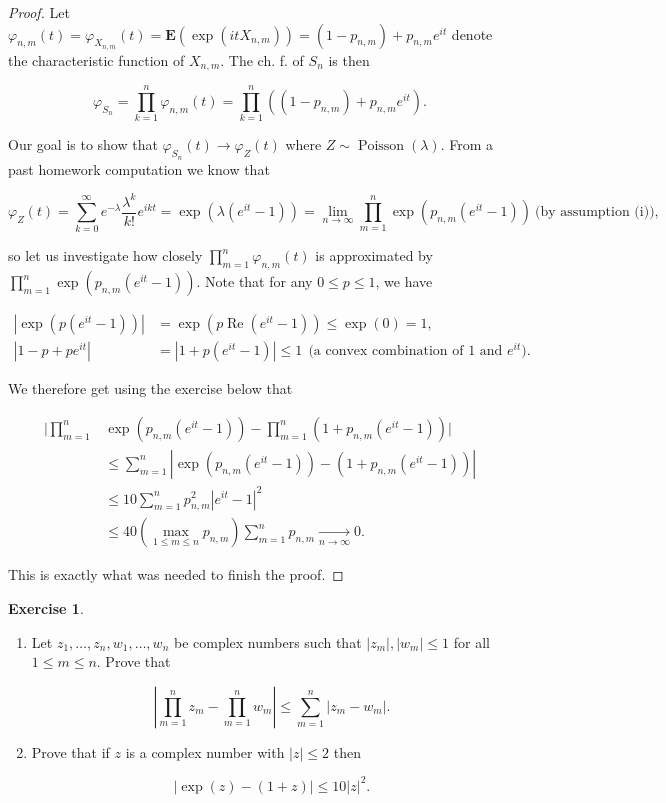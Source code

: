 \documentclass[11pt]{report}
\theoremstyle{plain}
\theoremstyle{definition}
\newtheorem{xexercise}[thm]{Exercise}
\begin{document}
\begin{proof}
Let
$\varphi_{n,m}(t)=\varphi_{X_{n,m}}(t)=\mathbf{E}(\exp(it
X_{n,m})) = (1-p_{n,m})+p_{n,m}e^{it}$
denote the characteristic function of $X_{n,m}$. The
ch. f. of $S_n$ is then

\[
\varphi_{S_n} = \prod_{k=1}^n \varphi_{n,m}(t) = \prod_{k=1}^n \left((1-p_{n,m})+p_{n,m}e^{it}\right).
\]

Our goal is to show that
$\varphi_{S_n}(t)\to \varphi_Z(t)$ where
$Z\sim \operatorname{Poisson}(\lambda)$. From a past
homework computation we know that

\[
\varphi_Z(t) = \sum_{k=0}^\infty e^{-\lambda} \frac{\lambda^k}{k!} e^{ikt} =\exp(\lambda(e^{it}-1)) = \lim_{n\to\infty} \prod_{m=1}^n \exp(p_{n,m}(e^{it}-1))
 \ \textrm{(by assumption (i)),}
\]

so let us investigate how closely
$\prod_{m=1}^n\varphi_{n,m}(t)$ is approximated by
$\prod_{m=1}^n\exp(p_{n,m}(e^{it}-1))$. Note that for
any $0\le p\le 1$, we have

\begin{align*}
|\exp(p(e^{it}-1))| &= \exp(p \operatorname{Re}(e^{it}-1)) \le \exp(0)=1, \\
|1-p+pe^{it}| &= |1+p(e^{it}-1)| \le 1 \ \ \textrm{(a convex combination of $1$ and $e^{it}$)}.
\end{align*}

We therefore get using the exercise below that

\begin{align*}
\Bigg| \prod_{m=1}^n &\exp\left(p_{n,m}(e^{it}-1)\right)-\prod_{m=1}^n (1+p_{n,m}(e^{it}-1))\Bigg| \\ &
\le \sum_{m=1}^n |\exp\left(p_{n,m}(e^{it}-1)\right)-(1+p_{n,m}(e^{it}-1))| \\
&\le 10\sum_{m=1}^n p_{n,m}^2 |e^{it}-1|^2 \\
&\le 40\left(\max_{1\le m\le n} p_{n,m}\right) \sum_{m=1}^n p_{n,m} \xrightarrow[n\to\infty]{} 0.
\end{align*}

This is exactly what was needed to finish the proof.
\end{proof}

\begin{xexercise}

\begin{enumerate}[label=(\roman*)]
\item Let $z_1,\ldots,z_n, w_1,\ldots, w_n$ be complex
numbers such that $|z_m|, |w_m|\le 1$ for all
$1\le m\le n$. Prove that

\[
\left|\prod_{m=1}^n z_m - \prod_{m=1}^n w_m \right| \le \sum_{m=1}^n |z_m-w_m|.
\]

\item Prove that if $z$ is a complex number with $|z|\le 2$
then

\[
|\exp(z)-(1+z)| \le 10 |z|^2.
\]
\end{enumerate}

\end{xexercise}
\end{document}
